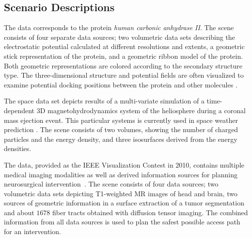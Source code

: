 \documentclass{egpubl}
\begin{document}
\subsection{Scenario Descriptions}
\label{sec:scenarios}

\begin{description}[font=\normalfont\itshape]
\item[Figure~\ref{fig:protein}, protein:]%
  The data corresponds to the protein \emph{human carbonic anhydrase II}.
  The scene consists of four separate data sources; two volumetric data sets describing the electrostatic potential calculated at different resolutions and extents, a geometric stick representation of the protein, and a geometric ribbon model of the protein.
  Both geometric representations are colored according to the secondary structure type.
  The three-dimensional structure and potential fields are often visualized to examine potential docking positions between the protein and other molecules \cite{Seeliger2010}.

\item[Figure~\ref{fig:space}, space:]%
  The space data set depicts results of a multi-variate simulation of a time-dependent 3D magnetohydrodynamics system of the heliosphere during a coronal mass ejection event.
  This particular systems is currently used in space weather prediction \cite{Xie2004}.
  The scene consists of two volumes, showing the number of charged particles and the energy density, and three isosurfaces derived from the energy densities.

\item[Figure~\ref{fig:neuro}, medical:]%
  The data, provided as the IEEE Visualization Contest in 2010, contains multiple medical imaging modalities as well as derived information sources for planning neurosurgical intervention~\cite{VisContest2010}.
  The scene consists of four data sources; two volumetric data sets depicting T1-weighted MR images of head and brain, two sources of geometric information in a surface extraction of a tumor segmentation and about $1678$ fiber tracts obtained with diffusion tensor imaging. %
  The combined information from all data sources is used to plan the safest possible access path for an intervention.


\end{description}
\end{document}
